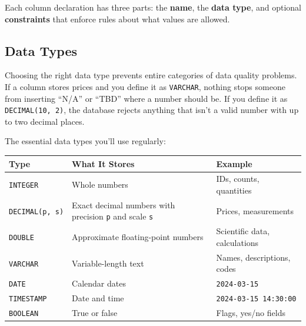 \documentclass[
  letterpaper,
  DIV=11,
  numbers=noendperiod]{scrreprt}
\begin{document}
Each column declaration has three parts: the \textbf{name}, the
\textbf{data type}, and optional \textbf{constraints} that enforce rules
about what values are allowed.

\subsection{Data Types}\label{data-types}

Choosing the right data type prevents entire categories of data quality
problems. If a column stores prices and you define it as
\texttt{VARCHAR}, nothing stops someone from inserting ``N/A'' or
``TBD'' where a number should be. If you define it as
\texttt{DECIMAL(10,\ 2)}, the database rejects anything that isn't a
valid number with up to two decimal places.

The essential data types you'll use regularly:

\begin{longtable}[]{@{}
  >{\raggedright\arraybackslash}p{}
  >{\raggedright\arraybackslash}p{}
  >{\raggedright\arraybackslash}p{}@{}}
\toprule\noalign{}
\begin{minipage}[b]{\linewidth}\raggedright
Type
\end{minipage} & \begin{minipage}[b]{\linewidth}\raggedright
What It Stores
\end{minipage} & \begin{minipage}[b]{\linewidth}\raggedright
Example
\end{minipage} \\
\midrule\noalign{}
\endhead
\bottomrule\noalign{}
\endlastfoot
\texttt{INTEGER} & Whole numbers & IDs, counts, quantities \\
\texttt{DECIMAL(p,\ s)} & Exact decimal numbers with precision
\texttt{p} and scale \texttt{s} & Prices, measurements \\
\texttt{DOUBLE} & Approximate floating-point numbers & Scientific data,
calculations \\
\texttt{VARCHAR} & Variable-length text & Names, descriptions, codes \\
\texttt{DATE} & Calendar dates & \texttt{2024-03-15} \\
\texttt{TIMESTAMP} & Date and time & \texttt{2024-03-15\ 14:30:00} \\
\texttt{BOOLEAN} & True or false & Flags, yes/no fields \\
\end{longtable}
\end{document}

